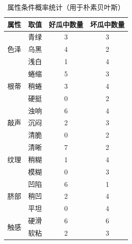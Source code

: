 \documentclass[12pt,a4paper]{ctexart}
\begin{document}
\begin{table}[H]
\centering
\caption{属性条件概率统计（用于朴素贝叶斯）}
\begin{tabular}{cccc}
\toprule
\textbf{属性} & \textbf{取值} & \textbf{好瓜中数量} & \textbf{坏瓜中数量} \\
\midrule
\multirow{3}{*}{色泽} & 青绿 & 3 & 3 \\
& 乌黑 & 4 & 2 \\
& 浅白 & 1 & 4 \\
\midrule
\multirow{3}{*}{根蒂} & 蜷缩 & 5 & 3 \\
& 稍蜷 & 3 & 4 \\
& 硬挺 & 0 & 2 \\
\midrule
\multirow{3}{*}{敲声} & 浊响 & 6 & 4 \\
& 沉闷 & 2 & 3 \\
& 清脆 & 0 & 2 \\
\midrule
\multirow{3}{*}{纹理} & 清晰 & 7 & 2 \\
& 稍糊 & 1 & 4 \\
& 模糊 & 0 & 3 \\
\midrule
\multirow{3}{*}{脐部} & 凹陷 & 6 & 1 \\
& 稍凹 & 2 & 4 \\
& 平坦 & 0 & 4 \\
\midrule
\multirow{2}{*}{触感} & 硬滑 & 6 & 6 \\
& 软粘 & 2 & 3 \\
\bottomrule
\end{tabular}
\end{table}
\end{document}
